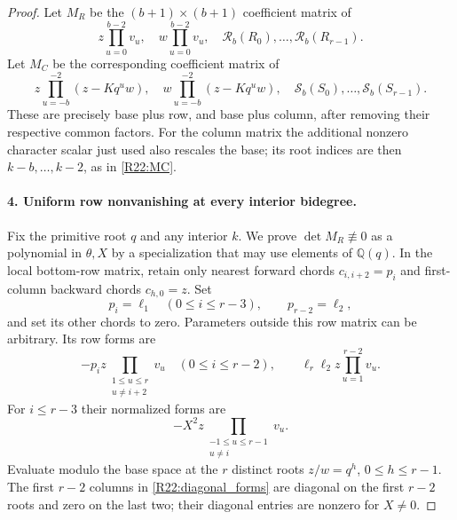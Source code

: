 \documentclass[11pt,a4paper]{article}
\theoremstyle{definition}\newtheorem{definition}{Definition}
\begin{document}
\begin{proof}
Let $M_R$ be the $(b+1)\times(b+1)$ coefficient matrix of
\begin{equation}\label{R22:MR}
 z\prod_{u=0}^{b-2}v_u,\quad
 w\prod_{u=0}^{b-2}v_u,\quad
 \mathcal R_b(R_0),\ldots,\mathcal R_b(R_{r-1}).
\end{equation}
Let $M_C$ be the corresponding coefficient matrix of
\begin{equation}\label{R22:MC}
 z\prod_{u=-b}^{-2}(z-Kq^uw),\quad
 w\prod_{u=-b}^{-2}(z-Kq^uw),\quad
 \mathcal S_b(S_0),\ldots,\mathcal S_b(S_{r-1}).
\end{equation}
These are precisely base plus row, and base plus column, after
removing their respective common factors. For the column matrix the
additional nonzero character scalar just used also rescales the base;
its root indices are then $k-b,\ldots,k-2$, as in
\eqref{R22:MC}.

\paragraph{4. Uniform row nonvanishing at every interior bidegree.}
Fix the primitive root $q$ and any interior $k$. We prove
$\det M_R\not\equiv0$ as a polynomial in $\theta,X$ by a specialization
that may use elements of $\mathbb Q(q)$.
In the local bottom-row matrix, retain only nearest forward chords
$c_{i,i+2}=p_i$ and first-column backward chords $c_{h,0}=z$.
Set
\[
 p_i=\ell_1\quad(0\leq i\leq r-3),\qquad
 p_{r-2}=\ell_2,
\]
and set its other chords to zero. Parameters outside this row matrix
can be arbitrary. Its row forms are
\[
 -p_i z\prod_{\substack{1\leq u\leq r\\u\ne i+2}}v_u
 \quad(0\leq i\leq r-2),
 \qquad \ell_r\ell_2z\prod_{u=1}^{r-2}v_u.
\]
For $i\leq r-3$ their normalized forms are
\begin{equation}\label{R22:diagonal_forms}
 -X^2z\prod_{\substack{-1\leq u\leq r-1\\u\ne i}}v_u.
\end{equation}
Evaluate modulo the base space at the $r$ distinct roots
$z/w=q^h$, $0\leq h\leq r-1$. The first $r-2$ columns in
\eqref{R22:diagonal_forms} are diagonal on the first $r-2$ roots and
zero on the last two; their diagonal entries are nonzero for $X\ne0$.


\end{proof}
\end{document}
